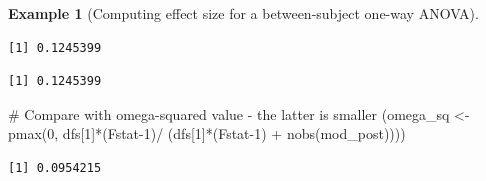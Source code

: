 \documentclass[
  11pt,
  letterpaper,
]{scrbook}
\newenvironment{Shaded}{\begin{snugshade}}{\end{snugshade}}
\newcommand{\AttributeTok}[1]{\textcolor[rgb]{0.40,0.45,0.13}{#1}}
\newcommand{\CommentTok}[1]{\textcolor[rgb]{0.37,0.37,0.37}{#1}}
\newcommand{\ConstantTok}[1]{\textcolor[rgb]{0.56,0.35,0.01}{#1}}
\newcommand{\DecValTok}[1]{\textcolor[rgb]{0.68,0.00,0.00}{#1}}
\newcommand{\FunctionTok}[1]{\textcolor[rgb]{0.28,0.35,0.67}{#1}}
\newcommand{\NormalTok}[1]{\textcolor[rgb]{0.00,0.23,0.31}{#1}}
\newcommand{\OtherTok}[1]{\textcolor[rgb]{0.00,0.23,0.31}{#1}}
\newcommand{\SpecialCharTok}[1]{\textcolor[rgb]{0.37,0.37,0.37}{#1}}
\theoremstyle{definition}
\theoremstyle{definition}
\newtheorem{example}{Example}[chapter]
\theoremstyle{remark}
\begin{document}
\begin{example}[Computing effect size for a between-subject one-way
ANOVA]
\begin{Shaded}
\end{Shaded}

\begin{verbatim}
[1] 0.1245399
\end{verbatim}

\begin{Shaded}
\end{Shaded}

\begin{verbatim}
[1] 0.1245399
\end{verbatim}

\begin{Shaded}
\begin{Highlighting}[]
\CommentTok{\# Compare with omega{-}squared value {-} the latter is smaller}
\NormalTok{(omega\_sq }\OtherTok{\textless{}{-}} \FunctionTok{pmax}\NormalTok{(}\DecValTok{0}\NormalTok{, dfs[}\DecValTok{1}\NormalTok{]}\SpecialCharTok{*}\NormalTok{(Fstat}\DecValTok{{-}1}\NormalTok{)}\SpecialCharTok{/}\NormalTok{ (dfs[}\DecValTok{1}\NormalTok{]}\SpecialCharTok{*}\NormalTok{(Fstat}\DecValTok{{-}1}\NormalTok{) }\SpecialCharTok{+} \FunctionTok{nobs}\NormalTok{(mod\_post))))}
\end{Highlighting}
\end{Shaded}

\begin{verbatim}
[1] 0.0954215
\end{verbatim}

\begin{Shaded}
\end{Shaded}


\end{example}
\end{document}
